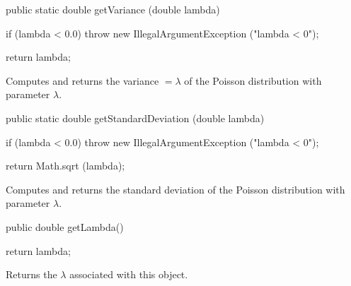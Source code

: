 \begin{code}

   public static double getVariance (double lambda)\begin{hide} {
      if (lambda < 0.0)
       throw new IllegalArgumentException ("lambda < 0");

      return lambda;
   }\end{hide}
\end{code}
\begin{tabb}  Computes and returns the variance $= \lambda$
   of the Poisson distribution with parameter $\lambda$.
\end{tabb}
\begin{htmlonly}
\end{htmlonly}
\begin{code}

   public static double getStandardDeviation (double lambda)\begin{hide} {
      if (lambda < 0.0)
       throw new IllegalArgumentException ("lambda < 0");

      return Math.sqrt (lambda);
   }\end{hide}
\end{code}
\begin{tabb}  Computes and returns the standard deviation of the
   Poisson distribution with parameter $\lambda$.
\end{tabb}
\begin{htmlonly}
\end{htmlonly}
\begin{code}

   public double getLambda()\begin{hide} {
      return lambda;
   }
\end{hide}
\end{code}
\begin{tabb}
   Returns the $\lambda$ associated with this object.
\end{tabb}
